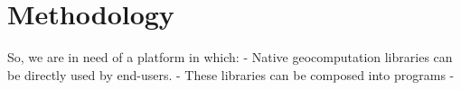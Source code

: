 \chapter{Methodology}
\label{chap:methodology}

\begin{note}
So, we are in need of a platform in which:
- Native geocomputation libraries can be directly used by end-users.
- These libraries can be composed into programs
- 



\end{note}






